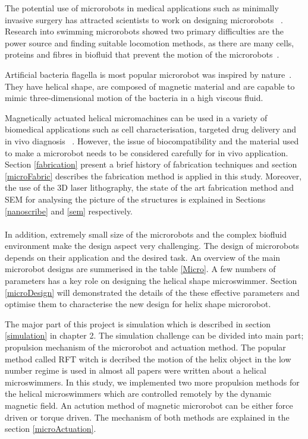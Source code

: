 \documentclass[12pt,a4paper,titlepage]{report}
\begin{document}
The potential use of microrobots in medical applications such as minimally invasive surgery 
has attracted scientists to work on designing microrobots ~\citep{edd2003biomimetic}. Research into swimming 
microrobots showed two primary difficulties are the power source and finding suitable locomotion methods, as
 there are many cells, proteins and fibres in biofluid that prevent the motion of the microrobots~\citep{peyer2013bio}. 

Artificial bacteria flagella is most popular microrobot was inspired by nature~\citep{qiu2014noncytotoxic}. 
They have helical shape, are composed of magnetic material and are capable to mimic three-dimensional 
motion of the bacteria in a high viscous fluid.

Magnetically actuated helical micromachines can be used
 in a variety of biomedical applications such as cell characterisation, targeted drug delivery and in vivo 
diagnosis ~\citep{peyer2013magnetic}. However, the issue of biocompatibility and the material 
used to make a microrobot needs to be considered carefully for in vivo application\citep{qiu2014noncytotoxic}. 
Section \ref{fabrication} present a brief history of fabrication techniques and section \ref{microFabric}
 describes the fabrication method is applied in this study. Moreover, the use of the 3D laser lithography, the state
 of the art fabrication method and \ac*{SEM} for analysing the picture of the structures is explained in
Sections \ref{nanoscribe} and \ref{sem} respectively.

\paragraph{}
In addition, extremely small size of the microrobots and the
complex biofluid environment make the design aspect very challenging. 
The design of microrobots depends on their application and the desired task. An overview of the main
 microrobot designs are summerised in the table \ref{Micro}. A few numbers of parameters 
has a key role on designing the helical shape microswimmer. Section \ref{microDesign} will demonstrated 
the details of the these effective parameters and optimise them to characterise the new design for 
helix shape microrobot. 

The major part of this project is simulation which is described in section \ref{simulation} in chapter 2. The simulation
challenge can be divided into main part; propulsion mechanism of the microrobot and actuation method. The
popular method called \ac*{RFT} witch is decribed the motion of the helix object in the low number regime 
is used in almost all papers\citep{qiu2014noncytotoxic} were written about a helical microswimmers. In this
study, we implemented two more propulsion methods for the helical microswimmers which are controlled 
remotely by the dynamic magnetic field. An actution method of magnetic microrobot can be either force driven or
torque driven. The mechanism of both methods are explained in the section \ref{microActuation}. 
\end{document}
